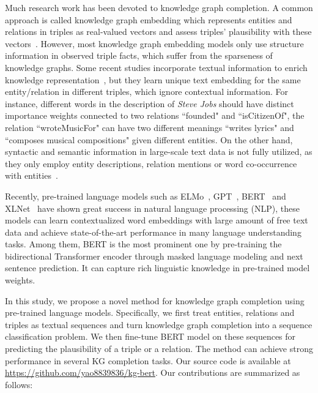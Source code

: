 \documentclass[letterpaper]{article} \usepackage{aaai20}  \usepackage{times}  \usepackage{helvet} \usepackage{courier}  \usepackage[hyphens]{url}  \usepackage{graphicx} \urlstyle{rm} \def\UrlFont{\rm}  \usepackage{graphicx}  \usepackage{amsmath}
\begin{document}
Much research work has been devoted to knowledge graph completion. A common approach is called knowledge graph embedding which represents entities and relations in triples as real-valued vectors and assess triples' plausibility with these vectors~\cite{wang2017knowledge}. However, most knowledge graph embedding models only use structure information in observed triple facts, which suffer from the sparseness of knowledge graphs. Some recent studies incorporate textual information to enrich knowledge representation~\cite{socher2013reasoning,xie2016representation,xiao2017ssp}, but they learn unique text embedding for the same entity/relation in different triples, which ignore contextual information. For instance, different words in the description of \textit{Steve Jobs} should have distinct importance weights connected to two relations ``founded" and ``isCitizenOf", the relation ``wroteMusicFor" can have two different meanings ``writes lyrics" and ``composes musical compositions" given different entities. On the other hand, syntactic and semantic information in large-scale text data is not fully utilized, as they only employ entity descriptions, relation mentions or word co-occurrence with entities~\cite{wang2016text,xu2017knowledge,an2018accurate}. 



Recently, pre-trained language models such as ELMo~\cite{peters2018deep}, GPT~\cite{radford2018improving}, BERT~\cite{devlin2019bert} and XLNet~\cite{yang2019xlnet} have shown great success in natural language processing (NLP), these models can learn contextualized word embeddings with large amount of free text data and achieve state-of-the-art performance in many language understanding tasks. Among them, BERT is the most prominent one by pre-training the bidirectional Transformer encoder through masked language modeling and next sentence prediction. It can capture rich linguistic knowledge in pre-trained model weights. 

In this study, we propose a novel method for knowledge graph completion using pre-trained language models. Specifically, we first treat entities, relations and triples as textual sequences and turn knowledge graph completion into a sequence classification problem. We then fine-tune BERT model on these sequences for predicting the plausibility of a triple or a relation. The method can achieve strong performance in several KG completion tasks. Our source code is available at \url{https://github.com/yao8839836/kg-bert}. Our contributions are summarized as follows:
\end{document}
